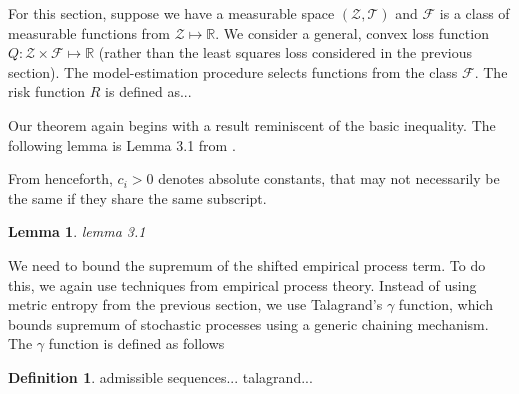 \documentclass[10pt]{book}
\newtheorem{lemma}{Lemma}
\theoremstyle{definition}
\newtheorem{definition}{Definition}
\begin{document}
For this section, suppose we have a measurable space $(\mathcal{Z}, \mathcal{T})$ and $\mathcal{F}$ is a class of measurable functions from $\mathcal{Z} \mapsto \mathbb{R}$.
We consider a general, convex loss function $Q: \mathcal{Z} \times \mathcal{F} \mapsto \mathbb{R}$ (rather than the least squares loss considered in the previous section).
The model-estimation procedure selects functions from the class $\mathcal{F}$.
The risk function $R$ is defined as...

Our theorem again begins with a result reminiscent of the basic inequality.
The following lemma is Lemma 3.1 from \citet{lecue2012oracle}.

From henceforth, $c_i > 0$ denotes absolute constants, that may not necessarily be the same if they share the same subscript.
\begin{lemma}
	lemma 3.1
\end{lemma}

We need to bound the supremum of the shifted empirical process term.
To do this, we again use techniques from empirical process theory.
Instead of using metric entropy from the previous section, we use Talagrand's $\gamma$ function, which bounds supremum of stochastic processes using a generic chaining mechanism.
The $\gamma$ function is defined as follows
\begin{definition}
	admissible sequences...
	talagrand...
\end{definition}
\end{document}
